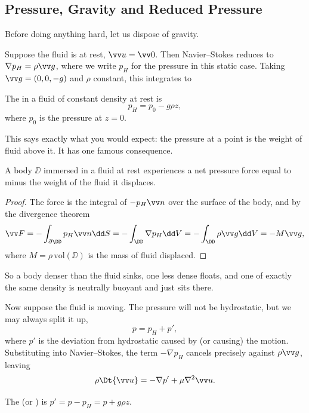 \subsection{Pressure, Gravity and Reduced Pressure}

Before doing anything hard, let us dispose of gravity.

Suppose the fluid is at rest, $\vv u = \vv 0$. Then Navier--Stokes reduces to $\nabla p_H = \rho \vv g$, where we write $p_H$ for the pressure in this static case. Taking $\vv g = (0, 0, -g)$ and $\rho$ constant, this integrates to

\begin{definition}
	The  in a fluid of constant density at rest is
	$$
	p_H = p_0 - g \rho z,
	$$
	where $p_0$ is the pressure at $z = 0$.
\end{definition}

This says exactly what you would expect: the pressure at a point is the weight of fluid above it. It has one famous consequence.

\begin{proposition}
	A body $\DD$ immersed in a fluid at rest experiences a net pressure force equal to minus the weight of the fluid it displaces.
\end{proposition}
\begin{proof}
	The force is the integral of $-p_H \vv n$ over the surface of the body, and by the divergence theorem
	$$
	\vv F = -\int_{\partial \DD} p_H \vv n \dd S = -\int_{\DD} \nabla p_H \dd V = -\int_\DD \rho \vv g \dd V = -M \vv g,
	$$
	where $M = \rho \, \mathrm{vol}(\DD)$ is the mass of fluid displaced. \qedhere
\end{proof}

So a body denser than the fluid sinks, one less dense floats, and one of exactly the same density is neutrally buoyant and just sits there.

Now suppose the fluid is moving. The pressure will not be hydrostatic, but we may always split it up,
$$
p = p_H + p',
$$
where $p'$ is the deviation from hydrostatic caused by (or causing) the motion. Substituting into Navier--Stokes, the term $-\nabla p_H$ cancels precisely against $\rho \vv g$, leaving
$$
\rho \Dt{\vv u} = -\nabla p' + \mu \nabla^2 \vv u.
$$

\begin{definition}
	The  (or )  is $p' = p - p_H = p + g\rho z$.
\end{definition}

